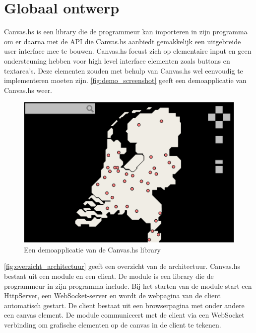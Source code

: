 \section{Globaal ontwerp}  \label{sec:globaal}
Canvas.hs is een library die de programmeur kan importeren in zijn programma om er daarna met de API die Canvas.hs aanbiedt gemakkelijk een uitgebreide user interface mee te bouwen. Canvas.hs focust zich op elementaire input en geen ondersteuning hebben voor high level interface elementen zoals buttons en textarea's. Deze elementen zouden met behulp van Canvas.hs wel eenvoudig te implementeren moeten zijn. \autoref{fig:demo_screenshot} geeft een demoapplicatie van Canvas.hs weer.


\begin{figure}[H]
\begin{center}
\includegraphics[keepaspectratio,width=\textwidth]{./images/demo.png}
\caption{Een demoapplicatie van de Canvas.hs library}
\label{fig:demo_screenshot}
\end{center}
\end{figure}


\autoref{fig:overzicht_architectuur} geeft een overzicht van de architectuur. Canvas.hs bestaat uit een module en een client. De module is een library die de programmeur in zijn programma include. Bij het starten van de module start een HttpServer, een WebSocket-server en wordt de webpagina van de client automatisch gestart. De client bestaat uit een browserpagina met onder andere een canvas element. De module communiceert met de client via een WebSocket verbinding om grafische elementen op de canvas in de client te tekenen.

